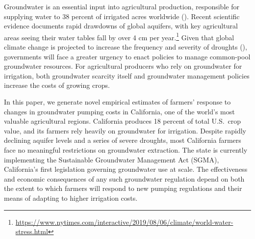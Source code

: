 %
%
Groundwater is an essential input into agricultural production, responsible for supplying water to 38 percent of irrigated acres worldwide (\textcite{siebert2010}). Recent scientific evidence documents rapid drawdowns of global aquifers, with key agricultural areas seeing their water tables fall by over 4 cm per year.\footnote{\url{https://www.nytimes.com/interactive/2019/08/06/climate/world-water-stress.html}} Given that global climate change is projected to increase the frequency and severity of droughts (\textcite{famiglietti2014}), governments will face a greater urgency to enact policies to manage common-pool groundwater resources. For agricultural producers who rely on groundwater for irrigation, both groundwater scarcity itself and groundwater management policies increase the costs of growing crops.

In this paper, we generate novel empirical estimates of farmers' response to changes in groundwater pumping costs in California, one of the world's most valuable agricultural regions. California produces 18 percent of total U.S.\ crop value, and its farmers rely heavily on groundwater for irrigation. Despite rapidly declining aquifer levels and a series of severe droughts, most California farmers face no meaningful restrictions on groundwater extraction. 
The state is currently implementing the Sustainable Groundwater Management Act (SGMA), California's first legislation governing groundwater use at scale. %
The effectiveness and economic consequences of any such groundwater regulation depend on both the extent to which farmers will respond to new pumping regulations and their means of adapting to higher irrigation costs.

